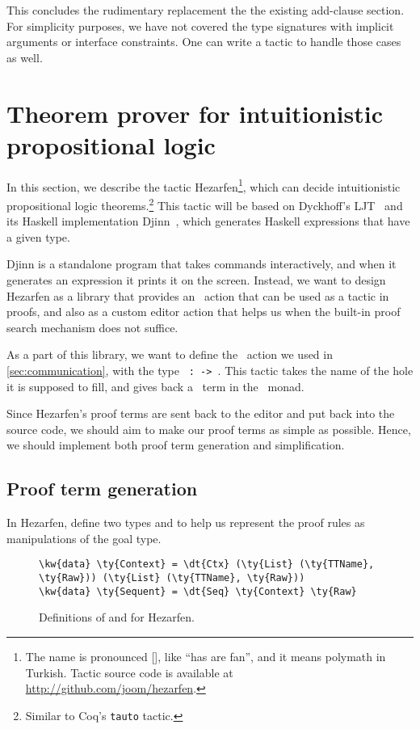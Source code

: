 This concludes the rudimentary replacement the the existing add-clause section.
For simplicity purposes, we have not covered the type signatures with implicit
arguments or interface constraints. One can write a tactic to handle
those cases as well.

\section{Theorem prover for intuitionistic propositional logic}\label{sec:hezarfen}

In this section, we describe the tactic Hezarfen\footnote{ The name is
  pronounced {[]}, like ``has are fan'', and it means
    polymath in Turkish.  Tactic source code is available at
    \url{http://github.com/joom/hezarfen}.}, which can decide intuitionistic
propositional logic theorems.\footnote{Similar to Coq's \texttt{tauto} tactic.}
This tactic will be based on Dyckhoff's LJT~\cite{ljt} and its Haskell
implementation Djinn~\cite{djinn}, which generates Haskell expressions
that have a given type.

Djinn is a standalone program that takes commands
interactively, and when it generates an expression it prints it on the screen.
Instead, we want to design Hezarfen as a library that provides an \Elab\ action
that can be used as a tactic in proofs, and also as a custom editor action that
helps us when the built-in proof search mechanism does not suffice.

As a part of this library, we want to define the \Elab\ action we used in
\autoref{sec:communication}, with the type
\texttt{ :  ->  }.
This tactic takes the name of the hole it is supposed to fill, and gives back a
\TT\ term in the \Elab\ monad.

Since Hezarfen's proof terms are sent back to the editor and put back into the
source code, we should aim to make our proof terms as simple as possible.
Hence, we should implement both proof term generation and simplification.

\subsection{Proof term generation}

In Hezarfen, define two types  and  to help us
represent the proof rules as manipulations of the goal type.

\begin{figure}[H]
\caption{Definitions of  and  for Hezarfen.}
\label{code:hezarfenTypes}
\begin{Verbatim}[framesep=2mm, label=\footnotesize{\normalfont{Idris}}, labelposition=topline]
\kw{data} \ty{Context} = \dt{Ctx} (\ty{List} (\ty{TTName}, \ty{Raw})) (\ty{List} (\ty{TTName}, \ty{Raw}))
\kw{data} \ty{Sequent} = \dt{Seq} \ty{Context} \ty{Raw}
\end{Verbatim}
\end{figure}

